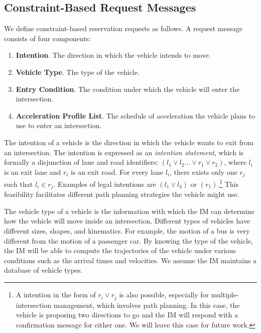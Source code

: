 \subsection{Constraint-Based Request Messages}
\label{sec:request}

We define constraint-based reservation requests as follows.
A request message consists of four components:
\begin{enumerate}
\item{\bf Intention}. The direction in which the vehicle intends to
  move.
\item{\bf Vehicle Type}. The type of the vehicle.
\item{\bf Entry Condition}. The condition under which the vehicle
  will enter the intersection.
\item{\bf Acceleration Profile List}. The schedule of acceleration
  the vehicle plans to use to enter an intersection.
\end{enumerate}

The intention of a vehicle is the direction in which the vehicle wants
to exit from an intersection.  The intention is expressed as an
\emph{intention statement}, which is formally a disjunction of lane
and road identifiers: $(l_1 \vee l_2 \ldots \vee r_1 \vee r_2)$, where
$l_i$ is an exit lane and $r_i$ is an exit road. For every lane $l_i$,
there exists only one $r_j$ such that $l_i \in r_j$. 
Examples of legal intentions are $(l_1 \vee l_3)$ or
$(r_1)$.\footnote{A intention in the form of $r_i \vee r_j$ is also possible,
especially for multiple-intersection management, which involves path
planning. In this case, the vehicle is proposing two directions to go
and the IM will respond with a confirmation message for either one. We
will leave this case for future work.}
This feasibility facilitates different path planning strategies the
vehicle might use.

The vehicle type of a vehicle is the information with which the IM can
determine how the vehicle will move inside an intersection.  Different
types of vehicles have different sizes, shapes, and kinematics.  For
example, the motion of a bus is very different from the motion of a
passenger car.  By knowing the type of the vehicle, the IM will be
able to compute the trajectories of the vehicle under various conditions
such as the arrival times and velocities. We assume the IM maintains
a database of vehicle types.

